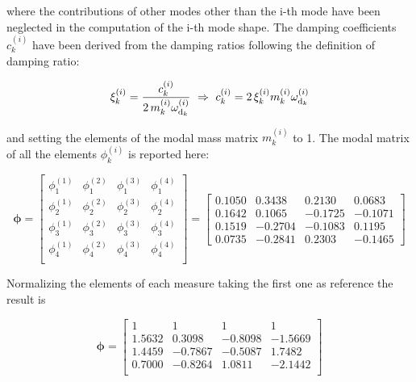 \documentclass[a4paper,12pt,oneside]{article}
\begin{document}
where the contributions of other modes other than the i-th mode have been neglected in the computation of the i-th mode shape. The damping coefficients $ c^{(i)}_k $ have been derived from the damping ratios following the definition of damping ratio:

\[ \begin{split}
	\xi^{(i)}_k = \frac{c^{(i)}_k}{2 \, m^{(i)}_k \omega_{\textup{d}_k}^{(i)}}
		~ \Rightarrow ~ c^{(i)}_k = 2 \, \xi^{(i)}_k m^{(i)}_k \omega_{\textup{d}_k}^{(i)}
\end{split} \]

and setting the elements of the modal mass matrix $ m^{(i)}_k $ to 1.
The modal matrix of all the elements $ \phi^{(i)}_k $ is reported here:

\[
	\bm{\phi} =	\begin{bmatrix}
								\phi_1^{(1)}	& \phi_1^{(2)} & \phi_1^{(3)}	& \phi_1^{(4)} \\
								\phi_2^{(1)}	& \phi_2^{(2)} & \phi_2^{(3)}	& \phi_2^{(4)} \\
								\phi_3^{(1)}	& \phi_3^{(2)} & \phi_3^{(3)}	& \phi_3^{(4)} \\
								\phi_4^{(1)}	& \phi_4^{(2)} & \phi_4^{(3)}	& \phi_4^{(4)} \\
							\end{bmatrix} = \begin{bmatrix}
																0.1050	& 0.3438	& 0.2130	& 0.0683 \\
																0.1642	& 0.1065	& -0.1725	& -0.1071 \\
																0.1519	& -0.2704	& -0.1083	& 0.1195 \\
																0.0735	& -0.2841	& 0.2303	& -0.1465
															\end{bmatrix}
\]

Normalizing the elements of each measure taking the first one as reference the result is

\[
	\bm{\phi} =	\begin{bmatrix}
								1				& 1				& 1				& 1 \\
								1.5632	& 0.3098	& -0.8098	& -1.5669 \\
								1.4459	& -0.7867 & -0.5087	& 1.7482 \\
								0.7000	& -0.8264 & 1.0811	& -2.1442 \\
							\end{bmatrix}
\]

\vspace{10pt}
\end{document}
